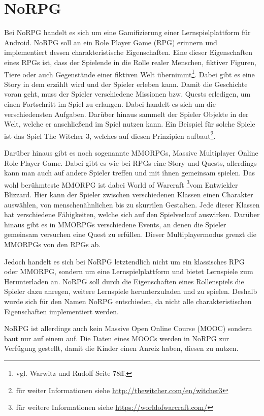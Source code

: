 \chapter{NoRPG}		
Bei NoRPG handelt es sich um eine Gamifizierung einer Lernspielplattform für Android. NoRPG soll an ein Role Player Game (RPG) erinnern und implementiert dessen charakteristische Eigenschaften. Eine dieser Eigenschaften eines RPGs ist, dass der Spielende in die Rolle realer Menschen, fiktiver Figuren, Tiere oder auch Gegenstände einer fiktiven Welt übernimmt\footnote{vgl. Warwitz und Rudolf \cite{rpgSinn} Seite 78ff.}. Dabei gibt es eine Story in dem erzählt wird und der Spieler erleben kann. Damit die Geschichte voran geht, muss der Spieler verschiedene Missionen bzw. Quests erledigen, um einen Fortschritt im Spiel zu erlangen. Dabei handelt es sich um die verschiedensten Aufgaben. Darüber hinaus sammelt der Spieler Objekte in der Welt, welche er anschließend im Spiel nutzen kann. Ein Beispiel für solche Spiele ist das Spiel The Witcher 3, welches auf diesen Prinzipien aufbaut\footnote{für weiter Informationen siehe \url{http://thewitcher.com/en/witcher3}}.
	
Darüber hinaus gibt es noch sogenannte MMORPGs, Massive Multiplayer Online Role Player Game. Dabei gibt es wie bei RPGs eine Story und Quests, allerdings kann man auch auf andere Spieler treffen und mit ihnen gemeinsam spielen. Das wohl berühmteste MMORPG ist dabei World of Warcraft \footnote{für weitere Informationen siehe \url{https://worldofwarcraft.com/}}vom Entwickler Blizzard. Hier kann der Spieler zwischen verschiedenen Klassen einen Charakter auswählen, von menschenähnlichen bis zu skurrilen Gestalten. Jede dieser Klassen hat verschiedene Fähigkeiten, welche sich auf den Spielverlauf auswirken. Darüber hinaus gibt es in MMORPGs verschiedene Events, an denen die Spieler gemeinsam versuchen eine Quest zu erfüllen. Dieser Multiplayermodus grenzt die MMORPGs von den RPGs ab.

Jedoch handelt es sich bei NoRPG letztendlich nicht um ein klassisches RPG oder MMORPG, sondern um eine Lernspielplattform und bietet Lernspiele zum Herunterladen an. NoRPG soll durch die Eigenschaften eines Rollenspiels die Spieler dazu anregen, weitere Lernspiele herunterzuladen und zu spielen. Deshalb wurde sich für den Namen NoRPG entschieden, da nicht alle charakteristischen Eigenschaften implementiert werden.

NoRPG ist allerdings auch kein Massive Open Online Course (MOOC) sondern baut nur auf einem auf. Die Daten eines MOOCs werden in NoRPG zur Verfügung gestellt, damit die Kinder einen Anreiz haben, diesen zu nutzen. 

